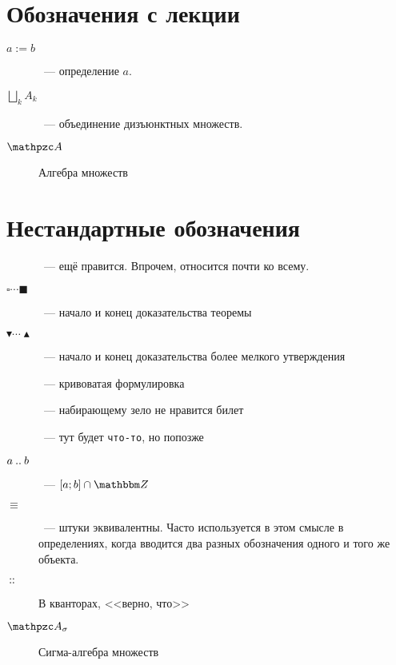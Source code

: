 \documentclass[12pt,timbord]{longnotes}
\begin{document}
\section*{Обозначения с лекции}
\begin{description}
  \item[$a:= b$]~--- определение $a$.
  \item[$\displaystyle \bigsqcup_k A_k$]~--- объединение дизъюнктных множеств.
  \item[$\alg$] Алгебра множеств
\end{description}

\section*{Нестандартные обозначения}

\begin{description}
  \item[\underdev]~--- ещё правится. Впрочем, относится почти ко всему.
  \item[$\square\cdots\blacksquare$]~--- начало и конец доказательства теоремы
  \item[$\blacktriangledown\cdots\blacktriangle$]~--- начало и конец доказательства более мелкого 
    утверждения
  \item[\sour]~--- кривоватая формулировка
  \item[\flame]~--- набирающему зело не нравится билет
  \item[]~--- тут будет \texttt{что-то}, но попозже
  \item[$a\mathbin{..} b$]~--- $[a;b]\cap \Z$
  \item[$\equiv$]~--- штуки эквивалентны. Часто используется в этом смысле в
    определениях, когда вводится два разных обозначения одного и того же
    объекта.
  \item[$\:::\:$] В кванторах, <<верно, что>>
  \item[$\alg_\sigma$] Сигма-алгебра множеств
\end{description}
\end{document}
